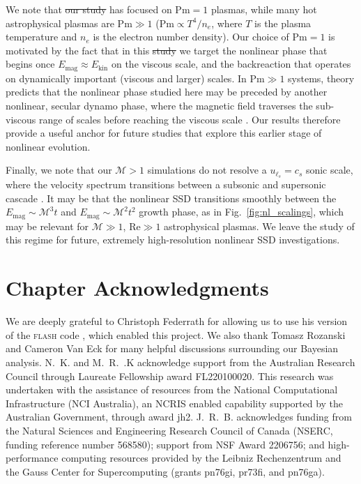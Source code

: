 \documentclass[12pt,twoside]{extreport}
\makeatletter
\newcommand{\mReh}{\ensuremath{\mathrm{Re}}} %
\newcommand{\mPrm}{\ensuremath{\mathrm{Pm}}} %
\newcommand{\mSonicMach}{\ensuremath{\mathcal{M}}} %
\providecommand{\DIFaddtex}[1]{{\protect\color{DIFgreen}\uwave{#1}}} %
\providecommand{\DIFdeltex}[1]{{\protect\color{DIFpurple}\sout{#1}}} %
\providecommand{\DIFaddbegin}{} %
\providecommand{\DIFaddend}{} %
\providecommand{\DIFdelbegin}{} %
\providecommand{\DIFdelend}{} %
\providecommand{\DIFadd}[1]{\texorpdfstring{\DIFaddtex{#1}}{#1}} %
\providecommand{\DIFdel}[1]{\texorpdfstring{\DIFdeltex{#1}}{}} %
\providecommand{\DIFscaledelfig}{0.5}
\newlength{\DIFdelgraphicswidth} %
\newlength{\DIFdelgraphicsheight} %
\providecommand{\DIFaddincludegraphics}[2][]{{\color{DIFgreen}\fbox{\DIFOincludegraphics[#1]{#2}}}} %
\providecommand{\DIFdelincludegraphics}[2][]{%
\sbox{\DIFdelgraphicsbox}{\DIFOincludegraphics[#1]{#2}}%
\settoboxwidth{\DIFdelgraphicswidth}{\DIFdelgraphicsbox} %
\settoboxtotalheight{\DIFdelgraphicsheight}{\DIFdelgraphicsbox} %
\scalebox{\DIFscaledelfig}{%
\parbox[b]{\DIFdelgraphicswidth}{\usebox{\DIFdelgraphicsbox}\\[-\baselineskip] \rule{\DIFdelgraphicswidth}{0em}}\llap{\resizebox{\DIFdelgraphicswidth}{\DIFdelgraphicsheight}{%
\setlength{\unitlength}{\DIFdelgraphicswidth}%
\begin{picture}(1,1)%
\thicklines\linethickness{2pt} %
{\color{DIFpurple}\put(0,0){\framebox(1,1){}}}%
{\color{DIFpurple}\put(0,0){\line( 1,1){1}}}%
{\color{DIFpurple}\put(0,1){\line(1,-1){1}}}%
\end{picture}%
}\hspace*{3pt}}} %
} %
\DeclareRobustCommand{\DIFaddbegin}{\DIFOaddbegin \let\includegraphics\DIFaddincludegraphics} %
\DeclareRobustCommand{\DIFaddend}{\DIFOaddend \let\includegraphics\DIFOincludegraphics} %
\DeclareRobustCommand{\DIFdelbegin}{\DIFOdelbegin \let\includegraphics\DIFdelincludegraphics} %
\DeclareRobustCommand{\DIFdelend}{\DIFOaddend \let\includegraphics\DIFOincludegraphics} %
\let\sout@orig\sout %
\renewcommand{\sout}[1]{\ifmmode\text{\sout@orig{\ensuremath{#1}}}\else\sout@orig{#1}\fi} %
\makeatother
\begin{document}
    We note that \DIFdelbegin \DIFdel{our study }\DIFdelend \DIFaddbegin \DIFadd{this chapter }\DIFaddend has focused on $\mPrm = 1$ plasmas, while many hot astrophysical plasmas are $\mPrm \gg 1$ ($\mPrm \propto T^4/n_e$, where $T$ is the plasma temperature and $n_e$ is the electron number density). Our choice of $\mPrm = 1$ is motivated by the fact that in this \DIFdelbegin \DIFdel{study }\DIFdelend \DIFaddbegin \DIFadd{chapter }\DIFaddend we target the nonlinear phase that begins once $E_\mathrm{mag} \approx E_\mathrm{kin}$ on the viscous scale, and the backreaction that operates on dynamically important (viscous and larger) scales. In $\mPrm \gg 1$ systems, theory predicts that the nonlinear phase studied here may be preceded by another nonlinear, secular dynamo phase, where the magnetic field traverses the sub-viscous range of scales before reaching the viscous scale \citep{schekochihin2002model}. Our results therefore provide a useful anchor for future studies that explore this earlier stage of nonlinear evolution.

    Finally, we note that our $\mSonicMach > 1$ simulations do not resolve a $u_{\ell_s} = c_s$ sonic scale, where the velocity spectrum transitions between a subsonic and supersonic cascade \citep{Federrath2021_the_sonic_scale, Beattie2025_nature_astronomy}. It may be that the nonlinear SSD transitions smoothly between the $E_\mathrm{mag} \sim \mSonicMach^3 t$ and $E_\mathrm{mag} \sim \mSonicMach^2 t^2$ growth phase, as in Fig.~\ref{fig:nl_scalings}, which may be relevant for $\mSonicMach \gg 1$, $\mReh \gg 1$ astrophysical plasmas. We leave the study of this regime for future, extremely high-resolution nonlinear SSD investigations.

\section*{Chapter Acknowledgments}

    We are deeply grateful to Christoph Federrath for allowing us to use his version of the \textsc{flash} code \citep{Federrath2021_the_sonic_scale, Federrath2022_TurbGen}, which enabled this project. We also thank Tomasz Rozanski and Cameron Van Eck for many helpful discussions surrounding our Bayesian analysis. N.~K. and M.~R.~.K acknowledge support from the Australian Research Council through Laureate Fellowship award FL220100020. This research was undertaken with the assistance of resources from the National Computational Infrastructure (NCI Australia), an NCRIS enabled capability supported by the Australian Government, through award jh2. J.~R.~B. acknowledges funding from the Natural Sciences and Engineering Research Council of Canada (NSERC, funding reference number 568580); support from NSF Award 2206756; and high-performance computing resources provided by the Leibniz Rechenzentrum and the Gauss Center for Supercomputing (grants pn76gi, pr73fi, and pn76ga).
\end{document}

